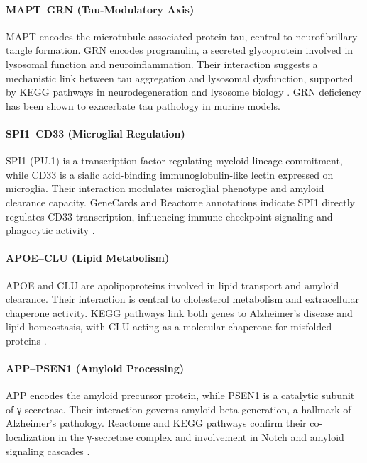 \documentclass[12pt]{article}
\begin{document}
\paragraph{MAPT–GRN (Tau-Modulatory Axis)}
MAPT encodes the microtubule-associated protein tau, central to neurofibrillary tangle formation. GRN encodes progranulin, a secreted glycoprotein involved in lysosomal function and neuroinflammation. Their interaction suggests a mechanistic link between tau aggregation and lysosomal dysfunction, supported by KEGG pathways in neurodegeneration and lysosome biology \citep{geneCardsMAPT, reactomeMAPTGRN}. GRN deficiency has been shown to exacerbate tau pathology in murine models.

\paragraph{SPI1–CD33 (Microglial Regulation)}
SPI1 (PU.1) is a transcription factor regulating myeloid lineage commitment, while CD33 is a sialic acid-binding immunoglobulin-like lectin expressed on microglia. Their interaction modulates microglial phenotype and amyloid clearance capacity. GeneCards and Reactome annotations indicate SPI1 directly regulates CD33 transcription, influencing immune checkpoint signaling and phagocytic activity \citep{geneCardsSPI1, reactomeSPI1CD33}.

\paragraph{APOE–CLU (Lipid Metabolism)}
APOE and CLU are apolipoproteins involved in lipid transport and amyloid clearance. Their interaction is central to cholesterol metabolism and extracellular chaperone activity. KEGG pathways link both genes to Alzheimer’s disease and lipid homeostasis, with CLU acting as a molecular chaperone for misfolded proteins \citep{geneCardsAPOE, reactomeAPOECLU}.

\paragraph{APP–PSEN1 (Amyloid Processing)}
APP encodes the amyloid precursor protein, while PSEN1 is a catalytic subunit of γ-secretase. Their interaction governs amyloid-beta generation, a hallmark of Alzheimer’s pathology. Reactome and KEGG pathways confirm their co-localization in the γ-secretase complex and involvement in Notch and amyloid signaling cascades \citep{reactomeAPPPSEN1, geneCardsAPP}.
\end{document}
